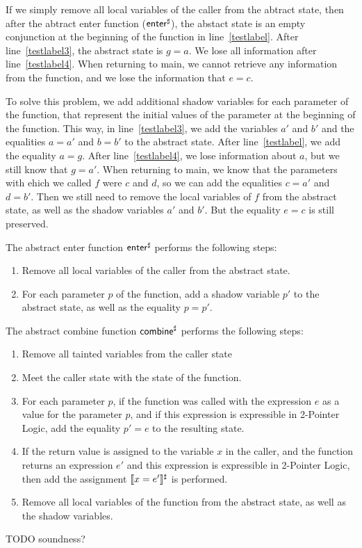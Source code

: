 \begin{example}
If we simply remove all local variables of the caller from the abtract state, then
after the abtract enter function ($\textsf{enter}^\sharp$), the abstact state is an empty conjunction
at the beginning of the function in line~\ref{testlabel}.
After line~\ref{testlabel3}, the abstract state is $g = a$.
We lose all information after line~\ref{testlabel4}.
When returning to \textsf{main}, we cannot retrieve any information from the function,
and we lose the information that $e = c$.

To solve this problem, we add additional shadow variables for each parameter of the function,
that represent the initial values of the parameter at the beginning of the function.
This way, in line~\ref{testlabel3}, we add the variables $a'$ and $b'$ and the equalities $a = a'$ and $b = b'$
to the abstract state.
After line~\ref{testlabel}, we add the equality $a = g$.
After line~\ref{testlabel4}, we lose information about $a$, but we still know that $g = a'$.
When returning to \textsf{main},
we know that the parameters with ehich we called $f$ were $c$ and $d$,
so we can add the equalities $c = a'$ and $d = b'$.
Then we still need to remove the local variables of $f$ from the abstract state,
as well as the shadow variables $a'$ and $b'$.
But the  equality $e = c$ is still preserved.
\end{example}

The abstract enter function $\textsf{enter}^\sharp$ performs the following steps:
\begin{enumerate}
    \item Remove all local variables of the caller from the abstract state.
    \item For each parameter $p$ of the function, add a shadow variable $p'$ to the abstract state,
as well as the equality $p = p'$.
\end{enumerate}

The abstract combine function $\textsf{combine}^\sharp$ performs the following steps:
\begin{enumerate}
    \item Remove all tainted  variables from the caller state
    \item Meet the caller state with the state of the function.
    \item For each parameter $p$, if the function was called with the
    expression $e$ as a value for the parameter $p$, and if this expression is expressible in 2-Pointer Logic,
     add the equality $p' = e$ to the resulting state.
    \item If the return value is assigned to the variable $x$ in the caller,
    and the function returns an expression $e'$ and this expression is expressible in 2-Pointer Logic,
    then add the assignment $\llbracket x = e'\rrbracket^\sharp$ is performed.
    \item Remove all local variables of the function from the abstract state,
    as well as the shadow variables.
\end{enumerate}
TODO soundness?
